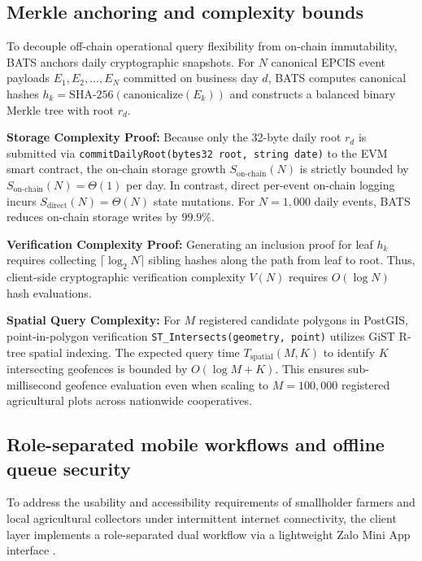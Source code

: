 \documentclass[runningheads]{llncs}
\begin{document}
\subsection{Merkle anchoring and complexity bounds}

To decouple off-chain operational query flexibility from on-chain immutability, BATS anchors daily cryptographic snapshots. For $N$ canonical EPCIS event payloads $E_1, E_2, \dots, E_N$ committed on business day $d$, BATS computes canonical hashes $h_k = \text{SHA-256}(\text{canonicalize}(E_k))$ and constructs a balanced binary Merkle tree with root $r_d$.

\textbf{Storage Complexity Proof:} Because only the 32-byte daily root $r_d$ is submitted via \texttt{commitDailyRoot(bytes32 root, string date)} to the EVM smart contract, the on-chain storage growth $S_{\text{on-chain}}(N)$ is strictly bounded by $S_{\text{on-chain}}(N) = \Theta(1)$ per day. In contrast, direct per-event on-chain logging incurs $S_{\text{direct}}(N) = \Theta(N)$ state mutations. For $N = 1{,}000$ daily events, BATS reduces on-chain storage writes by $99.9\%$.

\textbf{Verification Complexity Proof:} Generating an inclusion proof for leaf $h_k$ requires collecting $\lceil \log_2 N \rceil$ sibling hashes along the path from leaf to root. Thus, client-side cryptographic verification complexity $V(N)$ requires $O(\log N)$ hash evaluations.

\textbf{Spatial Query Complexity:} For $M$ registered candidate polygons in PostGIS, point-in-polygon verification \texttt{ST\_Intersects(geometry, point)} utilizes GiST R-tree spatial indexing. The expected query time $T_{\text{spatial}}(M, K)$ to identify $K$ intersecting geofences is bounded by $O(\log M + K)$. This ensures sub-millisecond geofence evaluation even when scaling to $M = 100{,}000$ registered agricultural plots across nationwide cooperatives.

\subsection{Role-separated mobile workflows and offline queue security}

To address the usability and accessibility requirements of smallholder farmers and local agricultural collectors under intermittent internet connectivity, the client layer implements a role-separated dual workflow via a lightweight Zalo Mini App interface \cite{Nguyen2023}.
\end{document}
